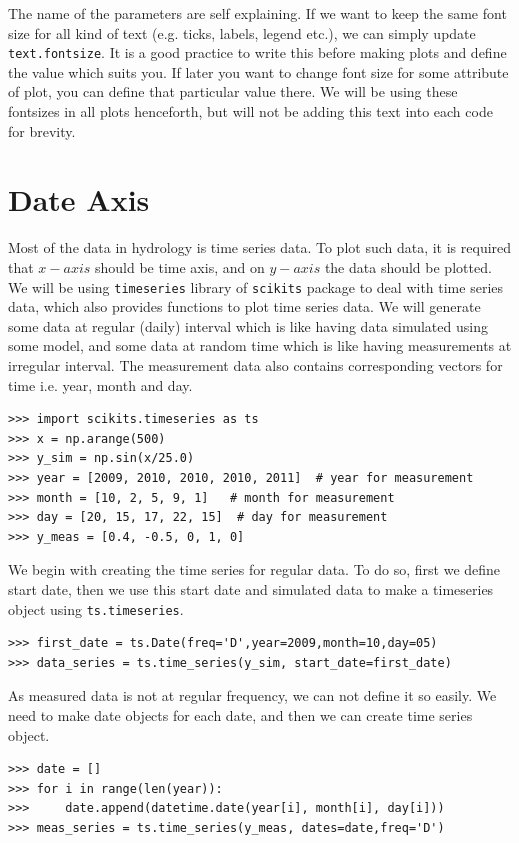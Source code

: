\documentclass[10pt]{book}
\begin{document}
The name of the parameters are self explaining. If we want to keep the same font size for all kind of text (e.g. ticks, labels, legend etc.), we can simply update \verb"text.fontsize". It is a good practice to write this before making plots and define the value which suits you. If later you want to change font size for some attribute of plot, you can define that particular value there. We will be using these fontsizes in all plots henceforth, but will not be adding this text into each code for brevity. \\

\section{Date Axis}
Most of the data in hydrology is time series data. To plot such data, it is required that $x-axis$ should be time axis, and on $y-axis$ the data should be plotted. We will be using \verb"timeseries" library of \verb"scikits" package to deal with time series data, which also provides functions to plot time series data. We will generate some data at regular (daily) interval which is like having data simulated using some model, and some data at random time which is like having measurements at irregular interval. The measurement data also contains corresponding vectors for time i.e. year, month and day.

\beforeverb \begin{verbatim}
>>> import scikits.timeseries as ts
>>> x = np.arange(500)
>>> y_sim = np.sin(x/25.0)
>>> year = [2009, 2010, 2010, 2010, 2011]  # year for measurement
>>> month = [10, 2, 5, 9, 1]   # month for measurement
>>> day = [20, 15, 17, 22, 15]  # day for measurement
>>> y_meas = [0.4, -0.5, 0, 1, 0]
\end{verbatim} \afterverb

We begin with creating the time series for regular data. To do so, first we define start date, then we use this start date and simulated data to make a timeseries object using \verb"ts.timeseries". 
\beforeverb \begin{verbatim}
>>> first_date = ts.Date(freq='D',year=2009,month=10,day=05)
>>> data_series = ts.time_series(y_sim, start_date=first_date)
\end{verbatim} \afterverb
As measured data is not at regular frequency, we can not define it so easily. We need to make date objects for each date, and then we can create time series object. 

\beforeverb \begin{verbatim}
>>> date = []
>>> for i in range(len(year)):
>>>     date.append(datetime.date(year[i], month[i], day[i]))
>>> meas_series = ts.time_series(y_meas, dates=date,freq='D')
\end{verbatim} \afterverb
\end{document}
